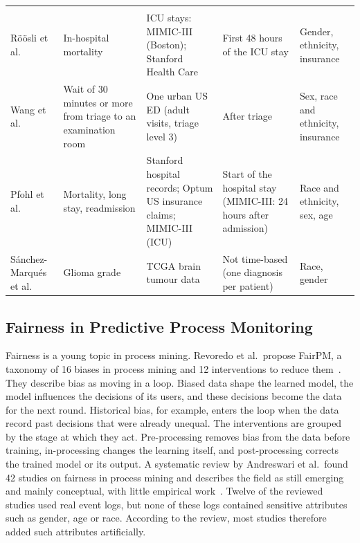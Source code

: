 \begin{table}[htbp]
\begin{tabularx}{\textwidth}{@{}>{\raggedright\arraybackslash}p{2.3cm}>{\raggedright\arraybackslash}p{2.4cm}>{\raggedright\arraybackslash}X>{\raggedright\arraybackslash}p{3.0cm}>{\raggedright\arraybackslash}p{2.1cm}@{}}
    \midrule
    \multicolumn{5}{@{}l}{\textit{Fairness of clinical prediction models}} \\
    Röösli et al.~\cite{roosli2022peeking} & In-hospital mortality & ICU stays: MIMIC-III (Boston); Stanford Health Care & First 48 hours of the ICU stay & Gender, ethnicity, insurance \\
    Wang et al.~\cite{wang2025evaluating} & Wait of 30 minutes or more from triage to an examination room & One urban US ED (adult visits, triage level 3) & After triage & Sex, race and ethnicity, insurance \\
    Pfohl et al.~\cite{pfohl2021empirical} & Mortality, long stay, readmission & Stanford hospital records; Optum US insurance claims; MIMIC-III (ICU) & Start of the hospital stay (MIMIC-III: 24 hours after admission) & Race and ethnicity, sex, age \\
    Sánchez-Marqués et al.~\cite{sanchezmarques2026addressing} & Glioma grade & TCGA brain tumour data & Not time-based (one diagnosis per patient) & Race, gender \\
    \bottomrule
  \end{tabularx}
\end{table}

\subsection{Fairness in Predictive Process Monitoring}\label{subsection::fairness_ppm}

Fairness is a young topic in process mining. Revoredo et al.\ propose FairPM, a taxonomy of 16 biases in process mining and 12 interventions to reduce them~\cite{revoredo2026fairpm}. They describe bias as moving in a loop. Biased data shape the learned model, the model influences the decisions of its users, and these decisions become the data for the next round. Historical bias, for example, enters the loop when the data record past decisions that were already unequal. The interventions are grouped by the stage at which they act. Pre-processing removes bias from the data before training, in-processing changes the learning itself, and post-processing corrects the trained model or its output. A systematic review by Andreswari et al.\ found 42 studies on fairness in process mining and describes the field as still emerging and mainly conceptual, with little empirical work~\cite{andreswari2025review}. Twelve of the reviewed studies used real event logs, but none of these logs contained sensitive attributes such as gender, age or race. According to the review, most studies therefore added such attributes artificially.


